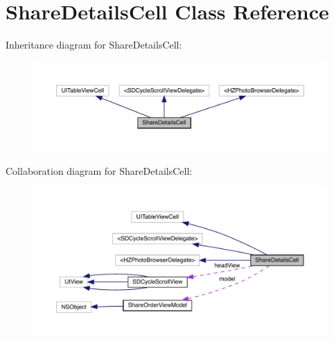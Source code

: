 \hypertarget{interface_share_details_cell}{}\section{Share\+Details\+Cell Class Reference}
\label{interface_share_details_cell}


Inheritance diagram for Share\+Details\+Cell\+:\nopagebreak
\begin{figure}[H]
\begin{center}
\leavevmode
\includegraphics[width=350pt]{interface_share_details_cell__inherit__graph}
\end{center}
\end{figure}


Collaboration diagram for Share\+Details\+Cell\+:\nopagebreak
\begin{figure}[H]
\begin{center}
\leavevmode
\includegraphics[width=350pt]{interface_share_details_cell__coll__graph}
\end{center}
\end{figure}
